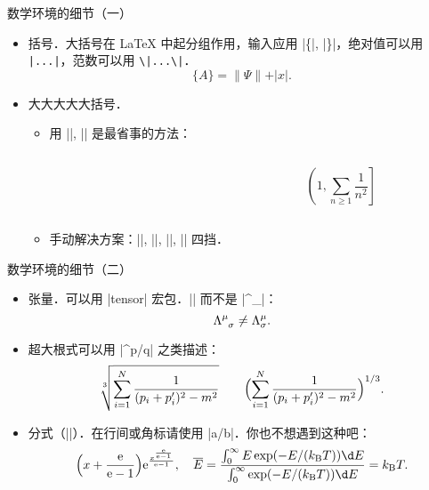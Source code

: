 \begin{frame}[fragile]{数学环境的细节（一）}
	\begin{itemize}
		\item<+-> 括号．大括号在 \LaTeX{} 中起分组作用，输入应用 |\{|, |\}|，绝对值可以用 \lstinline[style=style@inline]'|...|'，范数可以用 \lstinline[style=style@inline]'\|...\|'．
			\[\{A\} = \|\Psi \| + \vert x\vert.\]
		\item<+-> 大大大大大括号．
			\begin{itemize}
				\item 用 |\left|, |\right| 是最省事的方法：
				      \begin{columns}
					      \begin{column}{.58\textwidth}
						      
					      \end{column}
					      \begin{column}{.35\textwidth}
						      \[\left(1, \sum_{n\geqslant 1} \frac{1}{n^2} \right] \]
					      \end{column}
				      \end{columns}
				\item 手动解决方案：|\big|, |\Big|, |\bigg|, |\Bigg| 四挡．
			\end{itemize}
	\end{itemize}
\end{frame}

\begin{frame}[fragile]{数学环境的细节（二）}
	\begin{itemize}
		\item<+-> 张量．可以用 |tensor| 宏包．|\tensor{\Lambda }{^\mu _\sigma }| 而不是 |\Lambda ^\mu _\sigma|：
			\[\tensor{\Lambda }{^\mu _\sigma }\neq \Lambda ^\mu _\sigma.\]
		\item<+-> 超大根式可以用 |^{p/q}| 之类描述：
			\[
				\sqrt[3]{\sum_{i=1}^N\frac{1}{(p_i+p_i')^2-m^2}}\qquad \Bigl(\sum_{i=1}^N\frac{1}{(p_i+p_i')^2-m^2}\Bigr)^{1/3}.
			\]
		\item<+-> 分式（||）．在行间或角标请使用 |a/b|．你也不想遇到这种吧：\onslide<+->
			\begin{gather*}
				\Bigl(x+\frac{\mathrm e}{\mathrm e-1}\Bigr)\mathrm e^{\frac{x^{\frac{\mathrm e}{\mathrm e-1}}}{\mathrm e-1}},\quad
				\overline{E} = \frac{\int_0^\infty E \exp (-E/(k_{\mathrm  B}T))\d E}{\int_0^\infty \exp (-E/(k_{\mathrm  B}T))\d E} = k_{\mathrm B}T.
			\end{gather*}
	\end{itemize}
\end{frame}

